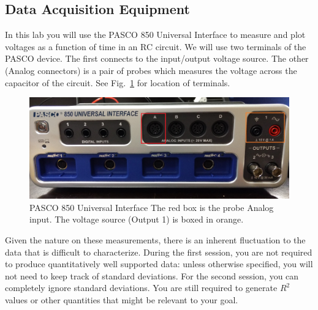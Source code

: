 \documentclass[12pt]{report}
\begin{document}
\subsection{Data Acquisition  Equipment} \label{Sect:lab2-equipment}
In this lab you will use the PASCO 850 Universal Interface to measure and plot voltages as a function of time in an RC circuit. 
We will use two terminals of the PASCO device. The first connects to the input/output voltage source. 
The other (Analog connectors) is a pair of probes which measures the voltage across the capacitor of the circuit. 
See Fig.~\ref{Fig:lab2-PASCO} for location of terminals.

\begin{figure}[h]
\centering
\includegraphics[width=0.8\linewidth]{lab2-PASCO}
\caption{PASCO 850 Universal Interface The red box is the probe Analog input. The voltage source (Output 1) is boxed in orange.}
\label{Fig:lab2-PASCO}
\end{figure}

Given the nature on these measurements, there is an inherent fluctuation to the data that is difficult to characterize. 
During the first session, you are not required to produce quantitatively well supported data: unless otherwise specified, you will not need to keep track of standard deviations.
For the second session, you can completely ignore standard deviations. You are still required to generate $R^2$ values or other quantities that might be relevant to your goal. 
\end{document}
